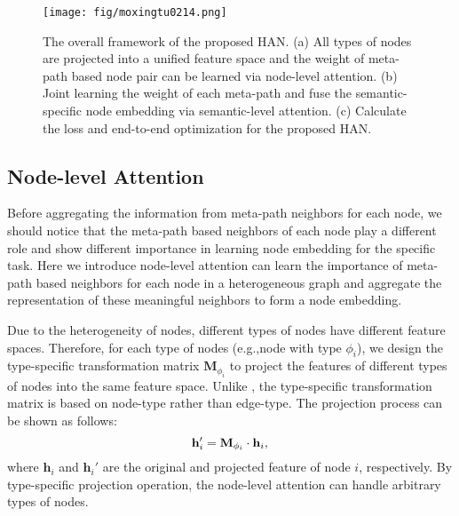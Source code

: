 \begin{figure}
\centering
	\texttt{[image: fig/moxingtu0214.png]}
\caption{The overall framework of the proposed HAN. (a) All types of nodes are projected into a unified feature space and the weight of meta-path based node pair can be learned via node-level attention.  (b) Joint learning the weight of each meta-path and fuse the semantic-specific node embedding via
		semantic-level attention. 
		(c) Calculate the loss and end-to-end optimization for the proposed HAN.
	}
	\label{liuchengtu}
\end{figure}



\subsection{Node-level Attention}
Before aggregating the information from meta-path neighbors for each node, we should notice that the meta-path based neighbors of each node play a different role and show different importance in learning node embedding for the specific task.
Here we introduce node-level attention can learn the importance of meta-path based neighbors for each node in a heterogeneous graph and aggregate the representation of these meaningful neighbors to form a node embedding.



Due to the heterogeneity of nodes, different types of nodes have different feature spaces.
Therefore, for each type of nodes (e.g.,node with type $\phi_i$), we design the type-specific transformation matrix  $\mathbf{M}_{\phi_i}$ to project 
the features of different types of nodes into the same feature space. Unlike \cite{hamilton2018embedding}, the type-specific transformation matrix  is based on node-type rather than edge-type. The projection process can be shown as follows:
\begin{equation}
\mathbf{h}_i'= \mathbf{M}_{\phi_i} \cdot \mathbf{h}_i,\\
\end{equation}
where $\mathbf{h}_i$  and $\mathbf{h}_i'$ are the original and projected feature of node $i$, respectively. By type-specific projection operation, the node-level attention can handle arbitrary types of nodes.


